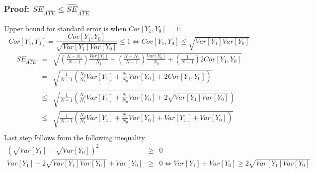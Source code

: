 \documentclass{beamer}
\numberwithin{equation}{section}
\begin{document}
\begin{frame}
  \frametitle{Proof: $SE_{\widehat{ATE}}\leq \widehat{SE}_{\widehat{ATE}}$}
\scriptsize
Upper bound for standard error is when $Cor[Y_1,Y_0]=1$:\[
Cor[Y_1,Y_0]=\frac{Cov[Y_1,Y_0]}{\sqrt{Var[Y_1]Var[Y_0]}} \leq 1 \Longleftrightarrow Cov[Y_1,Y_0] \leq \sqrt{Var[Y_1]Var[Y_0]}
\]
\begin{eqnarray*}
  SE_{\widehat{ATE}}  & = & \sqrt{ \left( \frac{N-N_1}{N-1}\right) \frac{Var[Y_{1}]}{N_1}+ \left( \frac{N-N_0}{N-1}\right) \frac{Var[Y_{0}]}{N_0} + \left(\frac{1}{N-1} \right) 2Cov[Y_{1},Y_{0}]} \\
 & = & \sqrt{ \frac{1}{N-1} \left(\frac{N_0}{N_1}Var[Y_1]+\frac{N_1}{N_0}Var[Y_0]+2Cov[Y_1,Y_0]\right)}  \\
                      & \leq & \sqrt{\frac{1}{N-1}\left( \frac{N_0}{N_1}Var[Y_1]+\frac{N_1}{N_0}Var[Y_0] +2\sqrt{Var[Y_1]Var[Y_0]}\right)} \\
                      & \leq & \sqrt{\frac{1}{N-1}\left( \frac{N_0}{N_1}Var[Y_1]+\frac{N_1}{N_0}Var[Y_0]  + Var[Y_1]+Var[Y_0]\right)} \\
\end{eqnarray*}
Last step follows from the following inequality
\begin{eqnarray*}
  (\sqrt{Var[Y_1]}-\sqrt{Var[Y_0]})^2 &\geq& 0 \\
  Var[Y_1] -2\sqrt{Var[Y_1]Var[Y_0]}+Var[Y_0]  &\geq&0  \Longleftrightarrow  Var[Y_1] + Var[Y_0] \geq 2\sqrt{Var[Y_1] Var[Y_0]}
\end{eqnarray*}
\end{frame}
\end{document}
